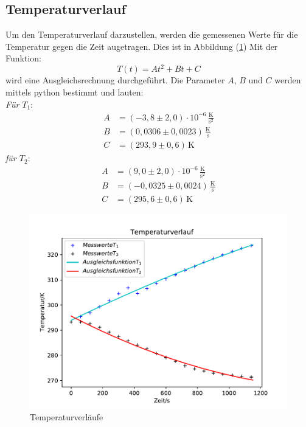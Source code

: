 \subsection{Temperaturverlauf}
Um den Temperaturverlauf darzustellen,
werden die gemessenen Werte für die Temperatur gegen die Zeit augetragen.
Dies ist in Abbildung (\ref{fig:temp})
Mit der Funktion:
\begin{equation*}
  T(t) = At^2 + Bt +C
\end{equation*}
 wird eine Ausgleichsrechnung durchgeführt.
 Die Parameter $A$, $B$ und $C$ werden mittels python bestimmt und lauten:\\
 \emph{Für $T_1$}:
 \begin{align*}
   A &= (-3,8 \pm 2,0)\cdot 10^{-6} \, \mathrm{\frac{K}{s^2}} \\
   B &= (0,0306 \pm 0,0023) \, \mathrm{\frac{K}{s}} \\
   C &= (293,9 \pm 0,6 )\, \mathrm{K}
 \end{align*}
 \emph{für $T_2$}:
 \begin{align*}
   A &= (9,0 \pm 2,0)\cdot 10^{-6}\, \mathrm{\frac{K}{s^2}} \\
   B &= (-0,0325 \pm 0,0024)\, \mathrm{\frac{K}{s}} \\
   C &= (295,6 \pm 0,6)\, \mathrm{K}
 \end{align*}

 \begin{figure}
   \centering
   \includegraphics[width=\textwidth]{temp.pdf}
   \caption{Temperaturverläufe}
   \label{fig:temp}
 \end{figure}

